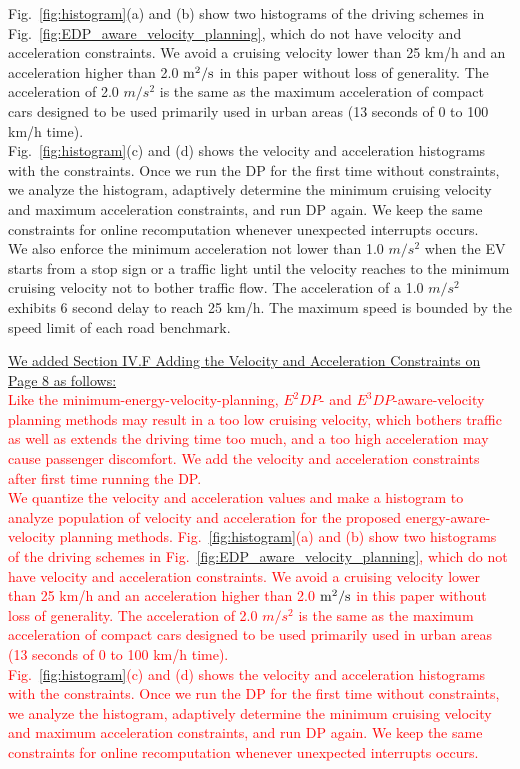 \documentclass[onecolumn]{IEEEconf}
\begin{document}
\begin{description}
Fig.~\ref{fig:histogram}(a) and (b) show two histograms of the driving schemes in Fig.~\ref{fig:EDP_aware_velocity_planning}, which do not have velocity and acceleration constraints. We avoid a cruising velocity lower than 25 km/h and an acceleration higher than 2.0 $\rm{m^2}/s$ in this paper without loss of generality. The  acceleration of 2.0 $m/s^2$ is the same as the maximum acceleration of compact cars designed to be used primarily used in urban areas (13 seconds of 0 to 100 km/h time).\\
Fig.~\ref{fig:histogram}(c) and (d) shows the velocity and acceleration histograms with the constraints. Once we run the DP for the first time without constraints, we analyze the histogram, adaptively determine the minimum cruising velocity and maximum acceleration constraints, and run DP again. We keep the same constraints for online recomputation whenever unexpected interrupts occurs.\\
We also enforce the minimum acceleration not lower than 1.0 $m/s^2$ when the EV starts from a stop sign or a traffic light until the velocity reaches to the minimum cruising velocity not to bother traffic flow. The acceleration of a 1.0 $m/s^2$ exhibits 6 second delay to reach 25 km/h. The maximum speed is bounded by the speed limit of each road benchmark.


\uline{We added Section IV.F Adding the Velocity and Acceleration Constraints on Page 8 as follows:}\\
\textcolor{red}{Like the minimum-energy-velocity-planning, $E^2DP$- and $E^3DP$-aware-velocity planning methods may result in a too low cruising velocity, which bothers traffic as well as extends the driving time too much, and a too high acceleration may cause passenger discomfort. We add the velocity and acceleration constraints after first time running the DP. \\
We quantize the velocity and acceleration values and make a histogram to analyze population of velocity and acceleration for the proposed energy-aware-velocity planning methods. Fig.~\ref{fig:histogram}(a) and (b) show two histograms of the driving schemes in Fig.~\ref{fig:EDP_aware_velocity_planning}, which do not have velocity and acceleration constraints. We avoid a cruising velocity lower than 25 km/h and an acceleration higher than 2.0 $\rm{m^2}/s$ in this paper without loss of generality. The  acceleration of 2.0 $m/s^2$ is the same as the maximum acceleration of compact cars designed to be used primarily used in urban areas (13 seconds of 0 to 100 km/h time).\\
Fig.~\ref{fig:histogram}(c) and (d) shows the velocity and acceleration histograms with the constraints. Once we run the DP for the first time without constraints, we analyze the histogram, adaptively determine the minimum cruising velocity and maximum acceleration constraints, and run DP again. We keep the same constraints for online recomputation whenever unexpected interrupts occurs.} 


\end{description}
\end{document}
